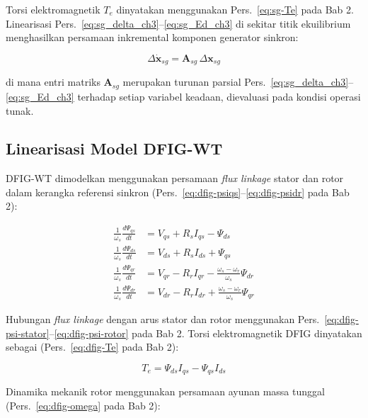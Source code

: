Torsi elektromagnetik $T_e$ dinyatakan menggunakan Pers.~\ref{eq:sg-Te} pada
Bab 2. Linearisasi Pers.~\eqref{eq:sg_delta_ch3}--\eqref{eq:sg_Ed_ch3} di
sekitar titik ekuilibrium menghasilkan persamaan inkremental komponen generator
sinkron:

\begin{equation}
    \Delta\dot{\mathbf{x}}_{sg} = \mathbf{A}_{sg}\,\Delta\mathbf{x}_{sg}
    \label{eq:sg_linear_ch3}
\end{equation}

\noindent di mana entri matriks $\mathbf{A}_{sg}$ merupakan turunan parsial
Pers.~\eqref{eq:sg_delta_ch3}--\eqref{eq:sg_Ed_ch3} terhadap setiap variabel
keadaan, dievaluasi pada kondisi operasi tunak.

\subsection{Linearisasi Model DFIG-WT}

DFIG-WT dimodelkan menggunakan persamaan \textit{flux linkage} stator dan rotor
dalam kerangka referensi sinkron (Pers.~\ref{eq:dfig-psiqs}--\ref{eq:dfig-psidr}
pada Bab 2):

\begin{align}
    \frac{1}{\omega_s}\frac{d\Psi_{qs}}{dt} &= V_{qs} + R_s I_{qs} - \Psi_{ds}
    \label{eq:dfig_psiqs_ch3} \\[4pt]
    \frac{1}{\omega_s}\frac{d\Psi_{ds}}{dt} &= V_{ds} + R_s I_{ds} + \Psi_{qs}
    \label{eq:dfig_psids_ch3} \\[4pt]
    \frac{1}{\omega_s}\frac{d\Psi_{qr}}{dt} &= V_{qr} - R_r I_{qr}
      - \frac{\omega_s - \omega_r}{\omega_s}\Psi_{dr}
    \label{eq:dfig_psiqr_ch3} \\[4pt]
    \frac{1}{\omega_s}\frac{d\Psi_{dr}}{dt} &= V_{dr} - R_r I_{dr}
      + \frac{\omega_s - \omega_r}{\omega_s}\Psi_{qr}
    \label{eq:dfig_psidr_ch3}
\end{align}

Hubungan \textit{flux linkage} dengan arus stator dan rotor menggunakan
Pers.~\ref{eq:dfig-psi-stator}--\ref{eq:dfig-psi-rotor} pada Bab 2. Torsi
elektromagnetik DFIG dinyatakan sebagai (Pers.~\ref{eq:dfig-Te} pada Bab 2):

\begin{equation}
    T_e = \Psi_{ds}I_{qs} - \Psi_{qs}I_{ds}
    \label{eq:dfig_Te_ch3}
\end{equation}

Dinamika mekanik rotor menggunakan persamaan ayunan massa tunggal
(Pers.~\ref{eq:dfig-omega} pada Bab 2):

